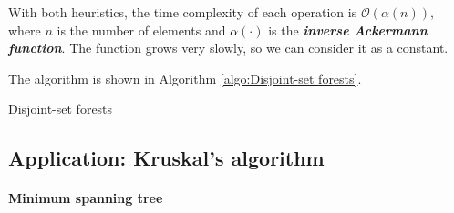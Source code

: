 \documentclass[12pt,a4paper]{ctexart}
\newcommand{\highlight}[1]{\textbf{\textit{#1}}}
\begin{document}
    With both heuristics, the time complexity of each operation is $\mathcal O(\alpha(n))$, where $n$ is the number of elements and $\alpha(\cdot)$ is the \highlight{inverse Ackermann function}. The function grows very slowly, so we can consider it as a constant.
    
    The algorithm is shown in Algorithm \ref{algo:Disjoint-set forests}.

    \begin{algorithm}
        \caption{Disjoint-set forests}
        \label{algo:Disjoint-set forests}

        \BlankLine


        \BlankLine



        \BlankLine


        \BlankLine

    \end{algorithm}

    \subsection{Application: Kruskal's algorithm}

    \paragraph{Minimum spanning tree}
\end{document}

